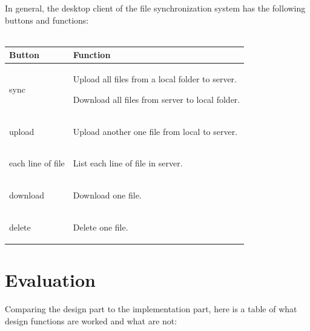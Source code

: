 \documentclass[a4paper]{article}
\begin{document}
{In general, the desktop client of the file synchronization system has the following buttons and functions:\\\\


\begin{minipage}{\linewidth}
\centering
{} \label{table:conflict}
\begin{tabular}[H]{|C{2 cm}|C{9.5 cm}|}\toprule[1.5pt]
\bf Button & \bf Function \\\midrule
sync 	&  \begin{flushleft}\item{Upload all files from a local folder to server.}\item{Download all files from server to local folder.}\end{flushleft}\\\hline
upload   &  \begin{flushleft}Upload another one file from local to server.\end{flushleft}\\\hline
each line of file   &  \begin{flushleft}List each line of file in server.\end{flushleft}\\\hline
download   &  \begin{flushleft}Download one file.\end{flushleft}\\\hline
delete  	&  \begin{flushleft}Delete one file.\end{flushleft}\\

\bottomrule[1.25pt]
\end {tabular}\par
\bigskip
\end{minipage}



\section{Evaluation}
Comparing the design part to the implementation part, here is a table of what design functions are worked and what are not:\\\\



}
\end{document}
